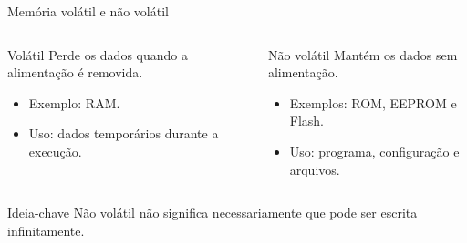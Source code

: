 \begin{frame}[t]{Memória volátil e não volátil}
  \begin{columns}[T]
    \begin{block}{Volátil}
      Perde os dados quando a alimentação é removida.
      \begin{itemize}
        \item Exemplo: RAM.
        \item Uso: dados temporários durante a execução.
      \end{itemize}
    \end{block}
    \begin{block}{Não volátil}
      Mantém os dados sem alimentação.
      \begin{itemize}
        \item Exemplos: ROM, EEPROM e Flash.
        \item Uso: programa, configuração e arquivos.
      \end{itemize}
    \end{block}
  \end{columns}
  \begin{alertblock}{Ideia-chave}
    Não volátil não significa necessariamente que pode ser escrita infinitamente.
  \end{alertblock}
\end{frame}
